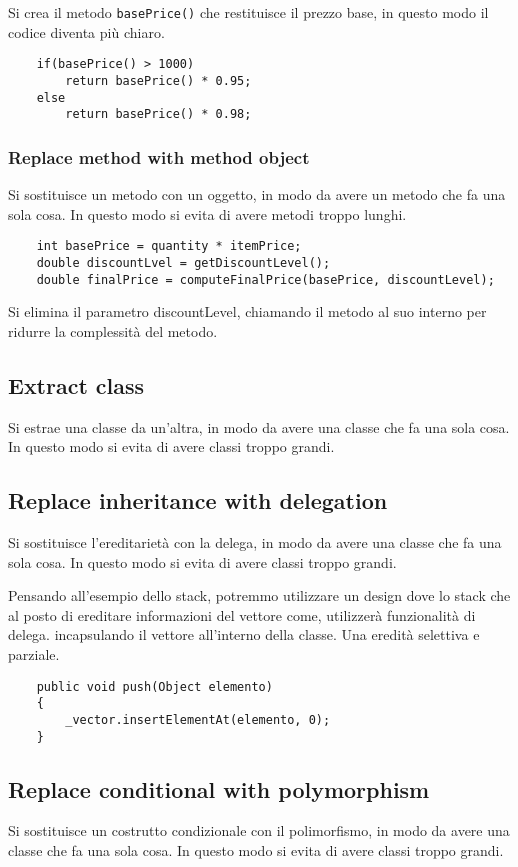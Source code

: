 Si crea il metodo \texttt{basePrice()} che restituisce il
prezzo base, in questo modo il codice diventa più chiaro.
\begin{lstlisting}
    if(basePrice() > 1000)
        return basePrice() * 0.95;
    else
        return basePrice() * 0.98;
\end{lstlisting}
\subsubsection{Replace method with method object}
Si sostituisce un metodo con un oggetto, in modo da avere un metodo
che fa una sola cosa. In questo modo si evita di avere metodi troppo lunghi.
\begin{lstlisting}
    int basePrice = quantity * itemPrice;
    double discountLvel = getDiscountLevel();
    double finalPrice = computeFinalPrice(basePrice, discountLevel);
\end{lstlisting}
Si elimina il parametro discountLevel, chiamando il metodo al suo interno 
per ridurre la complessità del metodo.
\subsection{Extract class}
Si estrae una classe da un'altra, in modo da avere una classe che
fa una sola cosa. In questo modo si evita di avere classi troppo grandi.
\subsection{Replace inheritance with delegation}
Si sostituisce l'ereditarietà con la delega, in modo da avere una classe che
fa una sola cosa. In questo modo si evita di avere classi troppo grandi.

Pensando all'esempio dello stack, potremmo utilizzare un design dove lo stack 
che al posto di ereditare informazioni del vettore come, utilizzerà funzionalità 
di delega. incapsulando il vettore all'interno della classe. Una eredità 
selettiva e parziale.
\begin{lstlisting}
    public void push(Object elemento)
    {
        _vector.insertElementAt(elemento, 0);
    }
\end{lstlisting}
\subsection{Replace conditional with polymorphism}
Si sostituisce un costrutto condizionale con il polimorfismo, in modo da
avere una classe che fa una sola cosa. In questo modo si evita di avere
classi troppo grandi.

